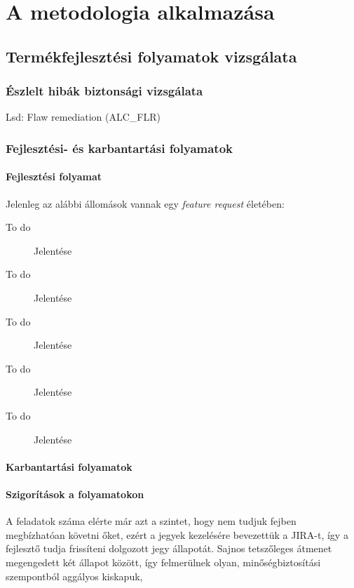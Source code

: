 \chapter{A metodologia alkalmazása}

\section{Termékfejlesztési folyamatok vizsgálata}
\subsection{Észlelt hibák biztonsági vizsgálata}

Lsd: Flaw remediation (ALC\_FLR)

\subsection{Fejlesztési- és karbantartási folyamatok}
\subsubsection{Fejlesztési folyamat}
Jelenleg az alábbi állomások vannak egy \emph{feature request} életében:
\begin{description}
    \item[To do] {Jelentése}
    \item[To do] {Jelentése}
    \item[To do] {Jelentése}
    \item[To do] {Jelentése}
    \item[To do] {Jelentése}
\end{description}

\subsubsection{Karbantartási folyamatok}

\subsubsection{Szigorítások a folyamatokon}

A feladatok száma elérte már azt a szintet, hogy nem tudjuk fejben megbízhatóan követni őket, ezért
a jegyek kezelésére bevezettük a JIRA-t, így a fejlesztő tudja frissíteni dolgozott jegy állapotát.
Sajnos tetszőleges átmenet megengedett két állapot között, így felmerülnek olyan, minőségbiztosítási
szempontból aggályos kiskapuk,

